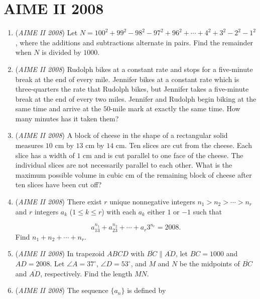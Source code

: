\section{AIME II 2008}
        \begin{enumerate}
        	\item (\textit{AIME II 2008}) Let $N = 100^2 + 99^2 - 98^2 - 97^2 + 96^2 + \cdots + 4^2 + 3^2 - 2^2 - 1^2$, where the additions and subtractions alternate in pairs. Find the remainder when $N$ is divided by $1000$.


 

	\item (\textit{AIME II 2008}) Rudolph bikes at a constant rate and stops for a five-minute break at the end of every mile. Jennifer bikes at a constant rate which is three-quarters the rate that Rudolph bikes, but Jennifer takes a five-minute break at the end of every two miles. Jennifer and Rudolph begin biking at the same time and arrive at the $50$-mile mark at exactly the same time. How many minutes has it taken them?


 

	\item (\textit{AIME II 2008}) A block of cheese in the shape of a rectangular solid measures $10$ cm by $13$ cm by $14$ cm. Ten slices are cut from the cheese. Each slice has a width of $1$ cm and is cut parallel to one face of the cheese. The individual slices are not necessarily parallel to each other. What is the maximum possible volume in cubic cm of the remaining block of cheese after ten slices have been cut off?


 

	\item (\textit{AIME II 2008}) There exist $r$ unique nonnegative integers $n_1 > n_2 > \cdots > n_r$ and $r$ integers $a_k$ ($1\le k\le r$) with each $a_k$ either $1$ or $- 1$ such that

 \[a_13^{n_1} + a_23^{n_2} + \cdots + a_r3^{n_r} = 2008.\]
Find $n_1 + n_2 + \cdots + n_r$.


 

	\item (\textit{AIME II 2008}) In trapezoid $ABCD$ with $\overline{BC}\parallel\overline{AD}$, let $BC = 1000$ and $AD = 2008$. Let $\angle A = 37^\circ$, $\angle D = 53^\circ$, and $M$ and $N$ be the midpoints of $\overline{BC}$ and $\overline{AD}$, respectively. Find the length $MN$.


 

	\item (\textit{AIME II 2008}) The sequence $\{a_n\}$ is defined by


\end{enumerate}
